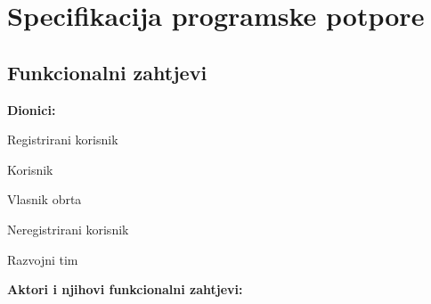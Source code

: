 \chapter{Specifikacija programske potpore}
		
	\section{Funkcionalni zahtjevi}
			
			\noindent \textbf{Dionici:}
			
			\begin{packed_enum}
				
				\item Registrirani korisnik
				\begin{packed_enum}
				
				    \item Korisnik 
				    \item Vlasnik obrta
				    
				\end{packed_enum}
				\item Neregistrirani korisnik
				\item Razvojni tim
				
			\end{packed_enum}
			
			\noindent \textbf{Aktori i njihovi funkcionalni zahtjevi:}
			
